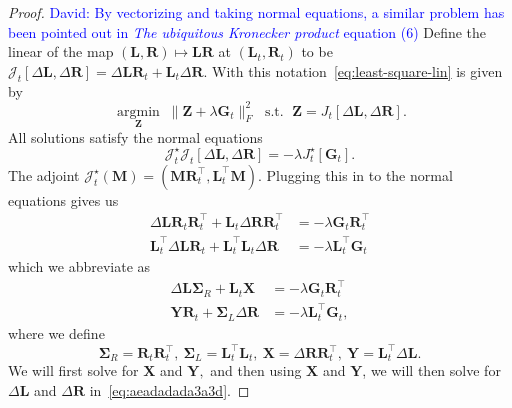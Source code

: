 \documentclass[11pt]{article}
\newcommand{\mat}[1]{\bm{#1}}
\newcommand{\mG}{\mat{G}}
\newcommand{\mL}{\mat{L}}
\newcommand{\mM}{\mat{M}}
\newcommand{\mR}{\mat{R}}
\newcommand{\mS}{\mat{\Sigma}}
\newcommand{\mW}{\mat{W}}
\newcommand{\mX}{\mat{X}}
\newcommand{\mY}{\mat{Y}}
\newcommand{\mZ}{\mat{Z}}
\newcommand{\dotprod}[1]{\left< #1\right>}
\DeclareMathOperator{\argmininn}{argmin}
\newcommand{\argmin}[1]{ \underset{#1}{\argmininn} \;}
\begin{document}
\begin{proof}
\textcolor{blue}{David: By vectorizing and taking normal equations, a similar problem has been pointed out in \emph{The ubiquitous Kronecker product} equation (6)} Define the linear of the map $(\mL, \mR) \mapsto \mL \mR$ at $(\mL_t, \mR_t)$ to be $\mathcal{J}_t[\Delta \mL, \Delta \mR] = \Delta \mL \mR_t + \mL_t \Delta \mR$.
With this notation~\eqref{eq:least-square-lin} is given by
\[
    \argmin{\mZ}  \|\mZ + \lambda \mG_t\|_F^2 \;\text{ s.t. } \;\mZ = J_t[\Delta \mL, \Delta \mR].
\]
All solutions satisfy the normal equations
\[
    \mathcal{J}_t^\star \mathcal{J}_t[\Delta \mL, \Delta \mR] = -\lambda J_t^\star[\mG_t]. 
\]
The adjoint $\mathcal{J}_t^\star(\mM) = (\mM \mR_t^\top, \mL_t^\top \mM)$. Plugging this in to the normal equations gives us
\begin{align*}
    \Delta \mL \mR_t \mR_t^\top + \mL_t \Delta \mR \mR_t^\top &= -\lambda \mG_t \mR_t^\top\\
    \mL_t^\top \Delta \mL \mR_t + \mL_t^\top \mL_t \Delta \mR &= -\lambda \mL_t^\top \mG_t
\end{align*}
which we abbreviate as
\begin{align}
    \Delta \mL \mS_{R} + \mL_t \mX &= -\lambda \mG_t \mR_t^\top \nonumber \\
    \mY \mR_t + \mS_{L} \Delta \mR &= -\lambda \mL_t^\top \mG_t, \label{eq:aeadadada3a3d}
\end{align}
where we define
\[
    \mS_{R} = \mR_t \mR_t^\top,~\mS_{L} = \mL_t^\top \mL_t,~\mX = \Delta \mR \mR_t^\top,~\mY = \mL_t^\top \Delta \mL.
\]
We will first solve for $\mX$ and $\mY,$ and then using $\mX$ and $\mY$, we will then solve for $\Delta \mL$ and $\Delta \mR$ in~\eqref{eq:aeadadada3a3d}. 


\end{proof}
\end{document}
